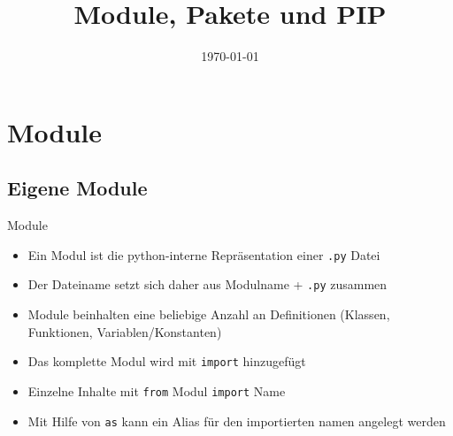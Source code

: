 

\usepackage{comment}

\newcommand{\topic}{
	Module, Pakete und PIP
}

\title{\topic}
\supertitle{\course}
\date{\today}



\maketitle

\begin{frame}
	\tableofcontents
\end{frame}


\section{Module}
\subsection{Eigene Module}
\begin{frame}[fragile]{Module}
	\begin{itemize}
		\item Ein Modul ist die python-interne Repräsentation einer \texttt{.py} Datei
		\item Der Dateiname setzt sich daher aus Modulname + \texttt{.py} zusammen
		\item Module beinhalten eine beliebige Anzahl an Definitionen (Klassen, Funktionen, Variablen/Konstanten)
		\item Das komplette Modul wird mit \texttt{import} hinzugefügt
		\item Einzelne Inhalte mit \texttt{from} Modul \texttt{import} Name
		\item Mit Hilfe von \texttt{as} kann ein Alias für den importierten namen angelegt werden
	\end{itemize}

\end{frame}


